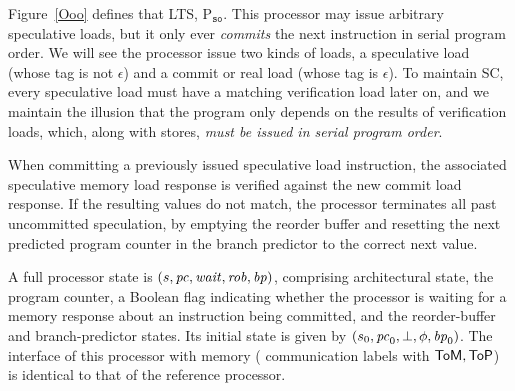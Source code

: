 Figure~\ref{Ooo} defines that LTS,
P$_{\texttt{so}}$. This processor may issue arbitrary speculative
loads, but it only ever \emph{commits} the next instruction in serial
program order. 
We will see the processor issue two kinds of loads, a speculative
load (whose tag is not $\epsilon$) and a commit or real load (whose tag is $\epsilon$).  To maintain SC, every speculative
load must have a matching verification load later on, and we maintain
the illusion that the program only depends on the results of
verification loads, which, along with stores, \emph{must be issued in
serial program order}.

When committing a
previously issued speculative load instruction, the associated speculative
memory load response is verified against the new commit load response. If the
resulting values do not match, the processor terminates all past uncommitted
speculation, by emptying the reorder buffer and resetting the
next predicted program counter in the branch predictor to the correct next value.


A full processor state is $(s, \mathit{pc}, \mathit{wait}, \mathit{rob}, \mathit{bp})$, comprising
architectural state, the program counter, a Boolean flag indicating
whether the processor is waiting for a memory response about an
instruction being committed, and the reorder-buffer and branch-predictor
states. Its initial state is given by $(s_0, \mathit{pc}_0, \bot, \phi, \mathit{bp}_0)$.
The interface of this processor with memory (\ie{}
communication labels with $\mathsf{ToM}, \mathsf{ToP}$) is identical
to that of the reference processor.


